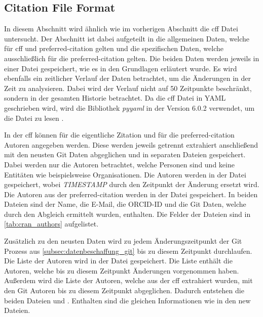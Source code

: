 \subsection{Citation File Format}
\label{subsec:datenbeschaffung_cff}
In diesem Abschnitt wird ähnlich wie im vorherigen Abschnitt die \gls{cff} Datei untersucht.
Der Abschnitt ist dabei aufgeteilt in die allgemeinen Daten, welche für \gls{cff} und \grqq preferred-citation\glqq{} gelten und die spezifischen Daten, welche ausschließlich für die \grqq preferred-citation\glqq{} gelten.
Die beiden Daten werden jeweils in einer  Datei gespeichert, wie es in den Grundlagen erläutert wurde.
Es wird ebenfalls ein zeitlicher Verlauf der Daten betrachtet, um die Änderungen in der Zeit zu analysieren.
Dabei wird der Verlauf nicht auf 50 Zeitpunkte beschränkt, sondern in der gesamten Historie betrachtet.
Da die \gls{cff} Datei in YAML geschrieben wird, wird die Bibliothek \emph{pyyaml} in der Version 6.0.2 verwendet, um die Datei zu lesen \autocite{noauthor_yamlpyyaml_2024}.

In der \gls{cff} können für die eigentliche Zitation und für die \grqq preferred-citation\glqq{} Autoren angegeben werden.
Diese werden jeweils getrennt extrahiert anschließend mit den neusten Git Daten abgeglichen und in separaten Dateien gespeichert.
Dabei werden nur die Autoren betrachtet, welche Personen sind und keine Entitäten wie beispielsweise Organisationen.
Die Autoren werden in der Datei  gespeichert, wobei \emph{TIMESTAMP} durch den Zeitpunkt der Änderung ersetzt wird.
Die Autoren aus der \grqq preferred-citation\glqq{} werden in der Datei  gespeichert.
In beiden Dateien sind der Name, die E-Mail, die ORCID-ID und die Git Daten, welche durch den Abgleich ermittelt wurden, enthalten.
Die Felder der Dateien sind in \autoref{tab:cran_authors} aufgelistet.

Zusätzlich zu den neusten Daten wird zu jedem Änderungszeitpunkt der Git Prozess aus \autoref{subsec:datenbeschaffung_git} bis zu diesem Zeitpunkt durchlaufen.
Die Liste der Autoren wird in der Datei  gespeichert.
Die Liste enthält die Autoren, welche bis zu diesem Zeitpunkt Änderungen vorgenommen haben.
Außerdem wird die Liste der Autoren, welche aus der \gls{cff} extrahiert wurden, mit den Git Autoren bis zu diesem Zeitpunkt abgeglichen.
Dadurch entstehen die beiden Dateien  und .
Enthalten sind die gleichen Informationen wie in den \glqq new\grqq{} Dateien.

